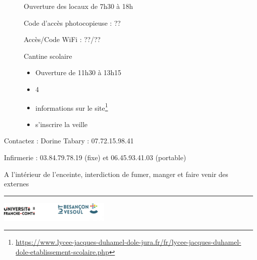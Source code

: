 \documentclass[10pt, a4paper]{article}
\begin{document}
\begin{titlepage}
\begin{center}
        
\begin{tcolorbox}[lefttitle=2cm, colframe=blue!25!gray, title= \textbf{Informations pratiques}]

\begin{figure}[H]
\begin{minipage}[t]{0.4\textwidth}Ouverture des locaux de 7h30 à 18h

Code d'accès photocopieuse : ??

Accès/Code WiFi : ??/??

\end{minipage}\hfill
\begin{minipage}[t]{0.47\textwidth}
Cantine scolaire
\begin{itemize}
    \item Ouverture de 11h30 à 13h15
    \item 4
    \item informations sur le site\footnote{\url{https://www.lycee-jacques-duhamel-dole-jura.fr/fr/lycee-jacques-duhamel-dole-etablissement-scolaire.php}}
    \item s'inscrire la veille
\end{itemize}

\end{minipage}
\end{figure}

\end{tcolorbox}


\begin{tcolorbox}[lefttitle=2cm, colframe=green!25!gray, title= \textbf{En cas de soucis}]
Contactez :
Dorine Tabary : 07.72.15.98.41

Infirmerie : 03.84.79.78.19 (fixe) et 06.45.93.41.03 (portable)

\end{tcolorbox}


\begin{tcolorbox}[lefttitle=2cm, colframe=red!25!gray, title= \textbf{Règles du lycée}]
A l'intérieur de l'enceinte, interdiction de fumer, manger et faire venir des externes

\end{tcolorbox}


    \vspace{0.5cm}
        
    \noindent\rule{12cm}{0.6pt}
        \vfill
        \includegraphics[width=0.4\textwidth]{logo.png}
        \\            
    \end{center}  
\end{titlepage}
\end{document}
